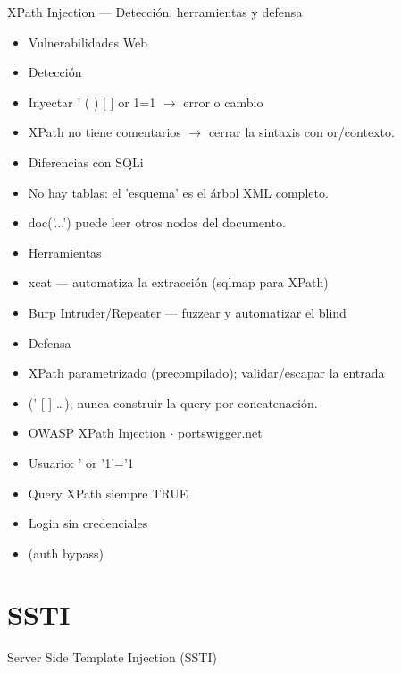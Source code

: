 \documentclass[aspectratio=169,10pt]{beamer}
\begin{document}
\begin{frame}[allowframebreaks]{XPath Injection --- Detección, herramientas y defensa}
\small
  \begin{itemize}
  \item Vulnerabilidades Web
  \item Detección
  \item Inyectar ' \textquotedbl{} ( ) [ ] or 1=1 $\rightarrow$ error o cambio
  \item XPath no tiene comentarios $\rightarrow$ cerrar la sintaxis con or/contexto.
  \item Diferencias con SQLi
  \item No hay tablas: el 'esquema' es el árbol XML completo.
  \item doc('...') puede leer otros nodos del documento.
  \item Herramientas
  \item xcat --- automatiza la extracción (sqlmap para XPath)
  \item Burp Intruder/Repeater --- fuzzear y automatizar el blind
  \item Defensa
  \item XPath parametrizado (precompilado); validar/escapar la entrada
  \item (' \textquotedbl{} [ ] \dots{}); nunca construir la query por concatenación.
  \item OWASP XPath Injection $\cdot$ portswigger.net
  \item Usuario: ' or '1'='1
  \item Query XPath siempre TRUE
  \item Login sin credenciales
  \item (auth bypass)
  \end{itemize}
\end{frame}

\section{SSTI}

\begin{frame}[allowframebreaks]{Server Side Template Injection (SSTI)}
\end{frame}
\end{document}
